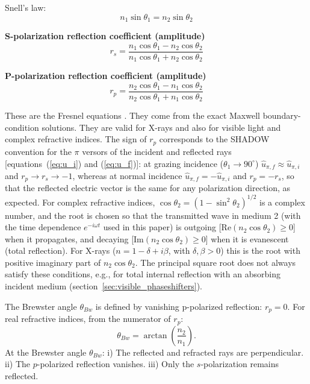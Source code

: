 \documentclass{iucr}
\begin{document}
Snell’s law:
\begin{equation}
n_1 \sin\theta_1 = n_2 \sin\theta_2
\end{equation}

\textbf{S-polarization reflection coefficient (amplitude)}
\begin{equation}
r_s =
\frac{n_1 \cos\theta_1 - n_2 \cos\theta_2}
     {n_1 \cos\theta_1 + n_2 \cos\theta_2}
\end{equation}

\textbf{P-polarization reflection coefficient (amplitude)}
\begin{equation}
r_p =
\frac{n_2 \cos\theta_1 - n_1 \cos\theta_2}
     {n_2 \cos\theta_1 + n_1 \cos\theta_2}
\end{equation}

These are the Fresnel equations \cite{born_wolf}. They come from the exact Maxwell boundary-condition solutions. They are valid for X-rays and also for visible light and complex refractive indices.
The sign of $r_p$ corresponds to the SHADOW convention for the $\pi$ versors of the incident and reflected rays [equations~(\ref{eq:u_i}) and (\ref{eq:u_f})]: at grazing incidence ($\theta_1\rightarrow 90^\circ$) $\hat{u}_{\pi,f}\approx\hat{u}_{\pi,i}$ and $r_p\rightarrow r_s\rightarrow -1$, whereas at normal incidence $\hat{u}_{\pi,f}=-\hat{u}_{\pi,i}$ and $r_p=-r_s$, so that the reflected electric vector is the same for any polarization direction, as expected.
For complex refractive indices, $\cos\theta_2=(1-\sin^2\theta_2)^{1/2}$ is a complex number, and the root is chosen so that the transmitted wave in medium 2 (with the time dependence $e^{-i\omega t}$ used in this paper) is outgoing [$\mathrm{Re}(n_2\cos\theta_2)\geq0$] when it propagates, and decaying [$\mathrm{Im}(n_2\cos\theta_2)\geq0$] when it is evanescent (total reflection). For X-rays ($n = 1 - \delta + i\beta$, with $\delta,\beta>0$) this is the root with positive imaginary part of $n_2\cos\theta_2$. The principal square root does not always satisfy these conditions, e.g., for total internal reflection with an absorbing incident medium (section~\ref{sec:visible_phaseshifters}).

The Brewster angle $\theta_{Bw}$ is defined by vanishing p-polarized reflection: $r_p = 0$.
For real refractive indices, from the numerator of $r_p$:
\begin{equation}
\theta_{Bw} = \arctan\left(\frac{n_2}{n_1}\right).
\end{equation}
At the Brewster angle $\theta_{Bw}$:
i) The reflected and refracted rays are perpendicular.
ii) The $p$-polarized reflection vanishes.
iii) Only the $s$-polarization remains reflected.
\end{document}
